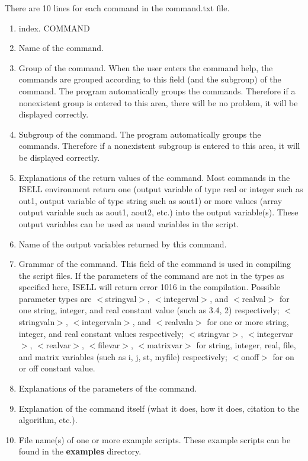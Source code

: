 \documentclass[a4paper,12pt]{book}
\begin{document}
There are 10 lines for each command in the command.txt file.
\begin{enumerate}
\item index. COMMAND
\item Name of the command. 
\item Group of the command. When the user enters the command help, the commands are grouped according to this field (and the subgroup) of the command. The program automatically groups the commands. Therefore if a nonexistent group is entered to this area, there will be no problem, it will be displayed correctly.
\item Subgroup of the command. The program automatically groups the commands. Therefore if a nonexistent subgroup is entered to this area, it will be displayed correctly.
\item Explanations of the return values of the command. Most commands in the ISELL environment return one (output variable of type real or integer such as out1, output variable of type string such as sout1) or more values (array output variable such as aout1, aout2, etc.) into the output variable(s). These output variables can be used as usual variables in the script.
\item Name of the output variables returned by this command.
\item Grammar of the command. This field of the command is used in compiling the script files. If the parameters of the command are not in the types as specified here, ISELL will return error 1016 in the compilation. Possible parameter types are $<$stringval$>$, $<$integerval$>$, and $<$realval$>$ for one string, integer, and real constant value (such as 3.4, 2) respectively; $<$stringvaln$>$, $<$integervaln$>$, and $<$realvaln$>$ for one or more string, integer, and real constant values respectively; $<$stringvar$>$, $<$integervar$>$, $<$realvar$>$, $<$filevar$>$, $<$matrixvar$>$ for string, integer, real, file, and matrix variables (such as i, j, st, myfile) respectively; $<$onoff$>$ for on or off constant value.
\item Explanations of the parameters of the command.
\item Explanation of the command itself (what it does, how it does, citation to the algorithm, etc.).
\item File name(s) of one or more example scripts. These example scripts can be found in the {\bf examples} directory.
\end{enumerate}
\end{document}
